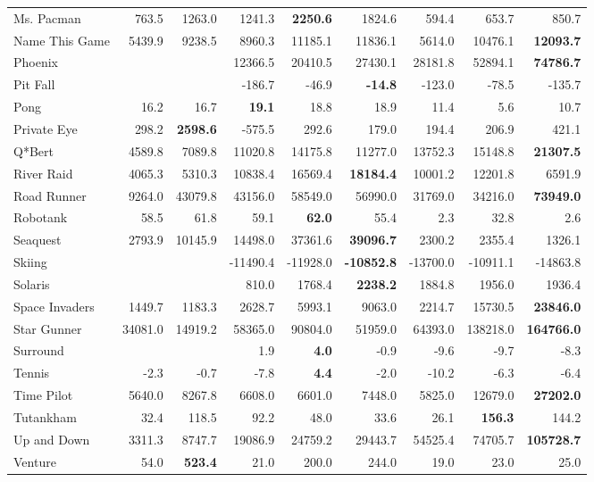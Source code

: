 \documentclass{article} \usepackage{times}
\begin{document}
\begin{table*}[h]
\begin{scriptsize}
\begin{tabular}{lrrrrrrrr}
Ms. Pacman & 763.5 & 1263.0 & 1241.3 & \textbf{2250.6} & 1824.6 & 594.4 & 653.7 & 850.7\\
Name This Game & 5439.9 & 9238.5 & 8960.3 & 11185.1 & 11836.1 & 5614.0 & 10476.1 & \textbf{12093.7}\\
Phoenix &  &  & 12366.5 & 20410.5 & 27430.1 & 28181.8 & 52894.1 & \textbf{74786.7}\\
Pit Fall &  &  & -186.7 & -46.9 & \textbf{-14.8} & -123.0 & -78.5 & -135.7\\
Pong & 16.2 & 16.7 & \textbf{19.1} & 18.8 & 18.9 & 11.4 & 5.6 & 10.7\\
Private Eye & 298.2 & \textbf{2598.6} & -575.5 & 292.6 & 179.0 & 194.4 & 206.9 & 421.1\\
Q*Bert & 4589.8 & 7089.8 & 11020.8 & 14175.8 & 11277.0 & 13752.3 & 15148.8 & \textbf{21307.5}\\
River Raid & 4065.3 & 5310.3 & 10838.4 & 16569.4 & \textbf{18184.4} & 10001.2 & 12201.8 & 6591.9\\
Road Runner & 9264.0 & 43079.8 & 43156.0 & 58549.0 & 56990.0 & 31769.0 & 34216.0 & \textbf{73949.0}\\
Robotank & 58.5 & 61.8 & 59.1 & \textbf{62.0} & 55.4 & 2.3 & 32.8 & 2.6\\
Seaquest & 2793.9 & 10145.9 & 14498.0 & 37361.6 & \textbf{39096.7} & 2300.2 & 2355.4 & 1326.1\\
Skiing &  &  & -11490.4 & -11928.0 & \textbf{-10852.8} & -13700.0 & -10911.1 & -14863.8\\
Solaris &  &  & 810.0 & 1768.4 & \textbf{2238.2} & 1884.8 & 1956.0 & 1936.4\\
Space Invaders & 1449.7 & 1183.3 & 2628.7 & 5993.1 & 9063.0 & 2214.7 & 15730.5 & \textbf{23846.0}\\
Star Gunner & 34081.0 & 14919.2 & 58365.0 & 90804.0 & 51959.0 & 64393.0 & 138218.0 & \textbf{164766.0}\\
Surround &  &  & 1.9 & \textbf{4.0} & -0.9 & -9.6 & -9.7 & -8.3\\
Tennis & -2.3 & -0.7 & -7.8 & \textbf{4.4} & -2.0 & -10.2 & -6.3 & -6.4\\
Time Pilot & 5640.0 & 8267.8 & 6608.0 & 6601.0 & 7448.0 & 5825.0 & 12679.0 & \textbf{27202.0}\\
Tutankham & 32.4 & 118.5 & 92.2 & 48.0 & 33.6 & 26.1 & \textbf{156.3} & 144.2\\
Up and Down & 3311.3 & 8747.7 & 19086.9 & 24759.2 & 29443.7 & 54525.4 & 74705.7 & \textbf{105728.7}\\
Venture & 54.0 & \textbf{523.4} & 21.0 & 200.0 & 244.0 & 19.0 & 23.0 & 25.0\\

\end{tabular}
\end{scriptsize}
\end{table*}
\end{document}

